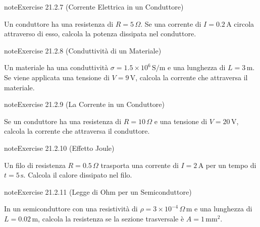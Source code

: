 \documentclass[letterpaper,10pt,italian]{jupyterBook}
\begin{document}
\begin{sphinxadmonition}{note}{Exercise 21.2.7 (Corrente Elettrica in un Conduttore)}



\sphinxAtStartPar
Un conduttore ha una resistenza di \(R = 5 \, \Omega\). Se una corrente di \(I = 0.2 \, \text{A}\) circola attraverso di esso, calcola la potenza dissipata nel conduttore.
\end{sphinxadmonition}
 \label{exercise:ch/electromagnetism/electric-current-problems-exercise-7}

\begin{sphinxadmonition}{note}{Exercise 21.2.8 (Conduttività di un Materiale)}



\sphinxAtStartPar
Un materiale ha una conduttività \(\sigma = 1.5 \times 10^6 \, \text{S/m}\) e una lunghezza di \(L = 3 \, \text{m}\). Se viene applicata una tensione di \(V = 9 \, \text{V}\), calcola la corrente che attraversa il materiale.
\end{sphinxadmonition}
 \label{exercise:ch/electromagnetism/electric-current-problems-exercise-8}

\begin{sphinxadmonition}{note}{Exercise 21.2.9 (La Corrente in un Conduttore)}



\sphinxAtStartPar
Se un conduttore ha una resistenza di \(R = 10 \, \Omega\) e una tensione di \(V = 20 \, \text{V}\), calcola la corrente che attraversa il conduttore.
\end{sphinxadmonition}
 \label{exercise:ch/electromagnetism/electric-current-problems-exercise-9}

\begin{sphinxadmonition}{note}{Exercise 21.2.10 (Effetto Joule)}



\sphinxAtStartPar
Un filo di resistenza \(R = 0.5 \, \Omega\) trasporta una corrente di \(I = 2 \, \text{A}\) per un tempo di \(t = 5 \, \text{s}\). Calcola il calore dissipato nel filo.
\end{sphinxadmonition}
 \label{exercise:ch/electromagnetism/electric-current-problems-exercise-10}

\begin{sphinxadmonition}{note}{Exercise 21.2.11 (Legge di Ohm per un Semiconduttore)}



\sphinxAtStartPar
In un semiconduttore con una resistività di \(\rho = 3 \times 10^{-4} \, \Omega \, \text{m}\) e una lunghezza di \(L = 0.02 \, \text{m}\), calcola la resistenza se la sezione trasversale è \(A = 1 \, \text{mm}^2\).
\end{sphinxadmonition}
 \label{exercise:ch/electromagnetism/electric-current-problems-exercise-11}
\end{document}
